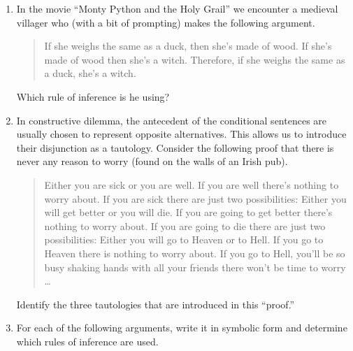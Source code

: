 \begin{enumerate}

\item In the movie ``Monty Python and the Holy Grail'' we encounter
a medieval villager who (with a bit of prompting) makes the 
following argument.

\begin{quote}
If she weighs the same as a duck, then she's made of wood. \newline
If she's made of wood then she's a witch. \newline
Therefore, if she weighs the same as a duck, she's a witch.
\end{quote} 

Which rule of inference is he using?

\item In constructive dilemma, the antecedent of the conditional 
sentences are usually chosen to represent opposite alternatives. 
This allows us to introduce their disjunction as a tautology. 
Consider the following proof that there is never any reason to worry
(found on the walls of an Irish pub).

\begin{quote}
Either you are sick or you are well. \newline
If you are well there's nothing to worry about. \newline
If you are sick there are just two possibilities: \newline
Either you will get better or you will die. \newline
If you are going to get better there's nothing to worry about. \newline
If you are going to die there are just two possibilities:\newline
Either you will go to Heaven or to Hell. \newline
If you go to Heaven there is nothing to worry about.
If you go to Hell, you'll be so busy shaking hands with all your friends there won't be time to worry \ldots
\end{quote}

Identify the three tautologies that are introduced in this ``proof.''

\newpage

\item For each of the following arguments, write it in symbolic form and determine 
which rules of inference are used.


\end{enumerate}

